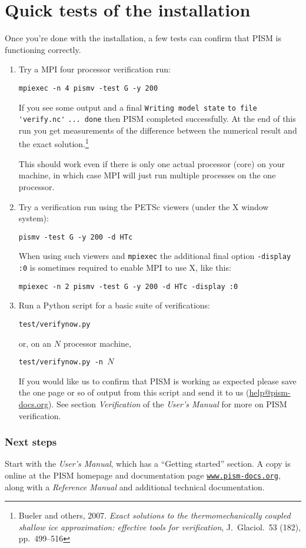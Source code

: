 \documentclass[11pt,final]{amsart}
\renewcommand{\t}[1]{\texttt{#1}}
\begin{document}
\clearpage
\section{Quick tests of the installation}
Once you're done with the installation, a few tests can confirm that PISM is functioning correctly.
\begin{enumerate}
\item Try a MPI four processor verification run:

\verb|mpiexec -n 4 pismv -test G -y 200|

\noindent If you see some output and a final \verb|Writing model state| \verb|to file 'verify.nc'| \verb|... done| then PISM
completed successfully.  At the end of this run you get measurements of the difference between the numerical result and
the exact solution.\footnote{Bueler and others, 2007.  \emph{Exact solutions to the thermomechanically coupled shallow ice approximation: effective tools for verification}, J.~Glaciol.~53 (182), pp.~499--516}

\noindent This should work even if there is only one actual processor (core) on your machine, in which case MPI will just run multiple processes on the one processor.

\item Try a verification run using the PETSc viewers (under the X window system):

\verb|pismv -test G -y 200 -d HTc|

\noindent When using such viewers and \verb|mpiexec| the additional final option \verb|-display :0| is sometimes required to enable MPI to use X, like this:

\verb|mpiexec -n 2 pismv -test G -y 200 -d HTc -display :0|

\item Run a Python script for a basic suite of verifications:

\verb|test/verifynow.py|

\noindent or, on an $N$ processor machine,

\verb|test/verifynow.py -n |$N$

\noindent If you would like us to confirm that PISM is working as expected please save the one page or so of output from this script and send it to us (\href{mailto:help@pism-docs.org}{help@pism-docs.org}).  See section \emph{Verification} of the \emph{User's Manual} for more on PISM verification.
\end{enumerate}

\subsubsection*{Next steps}  Start with the \emph{User's Manual}, which has a ``Getting started'' section.  A copy is online at the PISM homepage and documentation page \href{http://www.pism-docs.org/}{\t{www.pism-docs.org}}, along with a \emph{Reference Manual} and additional technical documentation.
\end{document}
